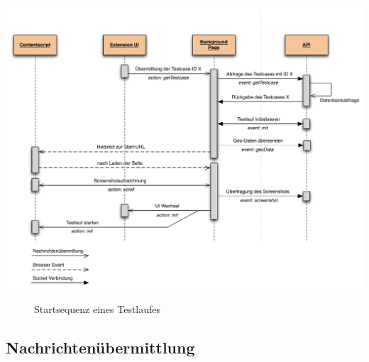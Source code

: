 \begin{center}
\includegraphics[scale=0.48]{./images/startsequenz}
\end{center}
\begin{figure}[htb]
    \centering
    \caption{Startsequenz eines Testlaufes}
    \label{startsequenz}
\end{figure}

\subsection{Nachrichtenübermittlung}

